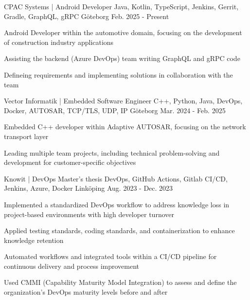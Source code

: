 

\begin{cventries}

\cventry
{CPAC Systems | Android Developer} %
{Java, Kotlin, TypeScript, Jenkins, Gerrit, Gradle, GraphQL, gRPC} %
{Göteborg} %
{Feb. 2025 - Present} %
{
  \begin{cvitems} %
    \item {Android Developer within the automotive domain, focusing on the development of construction industry applications}
    \item {Assisting the backend (Azure DevOps) team writing GraphQL and gRPC code}
    \item {Defineing requirements and implementing solutions in collaboration with the team}
  \end{cvitems}
}
  \cventry
    {Vector Informatik | Embedded Software Engineer} %
    {C++, Python, Java, DevOps, Docker, AUTOSAR, TCP/TLS, UDP, IP} %
    {Göteborg} %
    {Mar. 2024 - Feb. 2025} %
    {
      \begin{cvitems} %
        \item {Embedded C++ developer within Adaptive AUTOSAR, focusing on the network transport layer}
        \item {Leading multiple team projects, including technical problem-solving and development for customer-specific objectives}
      \end{cvitems}
    }

   \cventry
    {Knowit | DevOps Master's thesis} %
    {DevOps, GitHub Actions, Gitlab CI/CD, Jenkins, Azure, Docker} %
    {Linköping} %
    {Aug. 2023 - Dec. 2023} %
    {
      \begin{cvitems} %
        \item {Implemented a standardized DevOps workflow to address knowledge loss in project-based environments with high developer turnover}
        \item {Applied testing standards, coding standards, and containerization to enhance knowledge retention}
        \item {Automated workflows and integrated tools within a CI/CD pipeline for continuous delivery and process improvement}
        \item {Used CMMI (Capability Maturity Model Integration) to assess and define the organization’s DevOps maturity levels before and after}
      \end{cvitems}
    }


\end{cventries}
